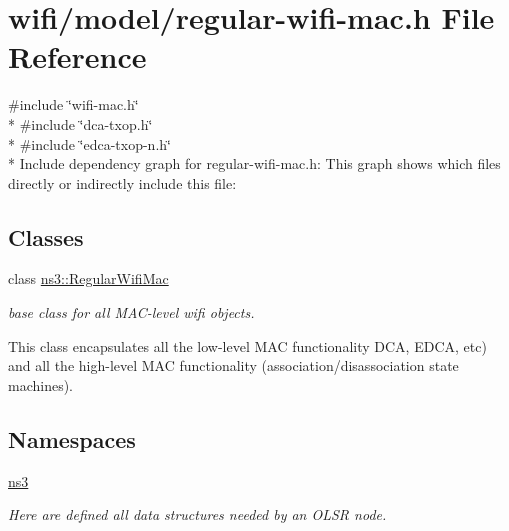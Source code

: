\hypertarget{regular-wifi-mac_8h}{}\section{wifi/model/regular-\/wifi-\/mac.h File Reference}
\label{regular-wifi-mac_8h}
{\ttfamily \#include \char`\"{}wifi-\/mac.\+h\char`\"{}}\\*
{\ttfamily \#include \char`\"{}dca-\/txop.\+h\char`\"{}}\\*
{\ttfamily \#include \char`\"{}edca-\/txop-\/n.\+h\char`\"{}}\\*
Include dependency graph for regular-\/wifi-\/mac.h\+:
This graph shows which files directly or indirectly include this file\+:
\subsection*{Classes}
\begin{DoxyCompactItemize}
\item 
class \hyperlink{classns3_1_1RegularWifiMac}{ns3\+::\+Regular\+Wifi\+Mac}
\begin{DoxyCompactList}\small\item\em base class for all M\+A\+C-\/level wifi objects.

This class encapsulates all the low-\/level M\+AC functionality D\+CA, E\+D\+CA, etc) and all the high-\/level M\+AC functionality (association/disassociation state machines). \end{DoxyCompactList}\end{DoxyCompactItemize}
\subsection*{Namespaces}
\begin{DoxyCompactItemize}
\item 
 \hyperlink{namespacens3}{ns3}
\begin{DoxyCompactList}\small\item\em Here are defined all data structures needed by an O\+L\+SR node. \end{DoxyCompactList}\end{DoxyCompactItemize}
